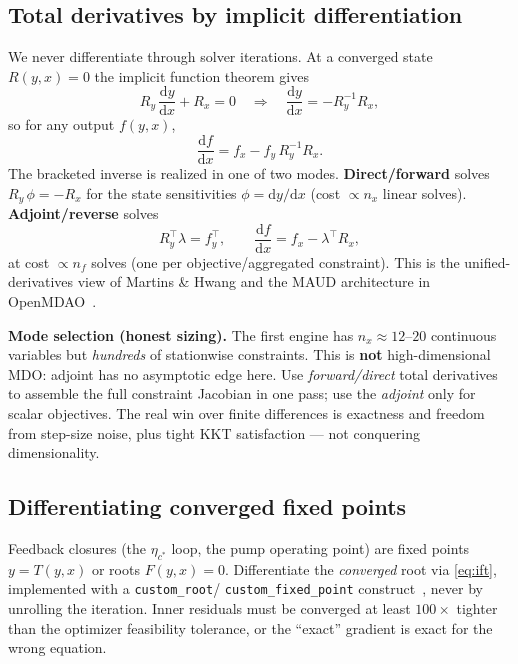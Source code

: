 \documentclass[11pt]{article}
\newcommand{\cmd}[1]{\nolinkurl{#1}}
\newcommand{\dd}[2]{\frac{\mathrm{d}#1}{\mathrm{d}#2}}
\newcommand{\cstar}{c^{*}}
\begin{document}
\subsection{Total derivatives by implicit differentiation}
We never differentiate through solver iterations. At a converged state
$R(y,x)=0$ the implicit function theorem gives
\begin{equation}
R_y\,\dd{y}{x}+R_x=0
\quad\Longrightarrow\quad
\dd{y}{x}=-R_y^{-1}R_x,
\label{eq:ift}
\end{equation}
so for any output $f(y,x)$,
\begin{equation}
\dd{f}{x}=f_x-f_y\,R_y^{-1}R_x .
\label{eq:total}
\end{equation}
The bracketed inverse is realized in one of two modes. \textbf{Direct/forward}
solves $R_y\,\phi=-R_x$ for the state sensitivities $\phi=\mathrm{d}y/\mathrm{d}x$
(cost $\propto n_x$ linear solves). \textbf{Adjoint/reverse} solves
\begin{equation}
R_y^{\!\top}\lambda=f_y^{\!\top},
\qquad
\dd{f}{x}=f_x-\lambda^{\!\top}R_x,
\label{eq:adjoint}
\end{equation}
at cost $\propto n_f$ solves (one per objective/aggregated constraint). This is
the unified-derivatives view of Martins \& Hwang and the MAUD architecture in
OpenMDAO~\cite{martinsHwang2013,hwangMartins2018,gray2019}.

\begin{keybox}
\textbf{Mode selection (honest sizing).} The first engine has
$n_x\!\approx\!12$--$20$ continuous variables but \emph{hundreds} of stationwise
constraints. This is \textbf{not} high-dimensional MDO: adjoint has no
asymptotic edge here. Use \emph{forward/direct} total derivatives to assemble
the full constraint Jacobian in one pass; use the \emph{adjoint} only for scalar
objectives. The real win over finite differences is exactness and freedom from
step-size noise, plus tight KKT satisfaction --- not conquering dimensionality.
\end{keybox}

\subsection{Differentiating converged fixed points}
Feedback closures (the $\eta_{\cstar}$ loop, the pump operating point) are
fixed points $y=T(y,x)$ or roots $F(y,x)=0$. Differentiate the \emph{converged}
root via \eqref{eq:ift}, implemented with a \cmd{custom\_root}/
\cmd{custom\_fixed\_point} construct~\cite{blondel2022,optimistix2024}, never by
unrolling the iteration. Inner residuals must be converged at least
$100\times$ tighter than the optimizer feasibility tolerance, or the
``exact'' gradient is exact for the wrong equation.
\end{document}

